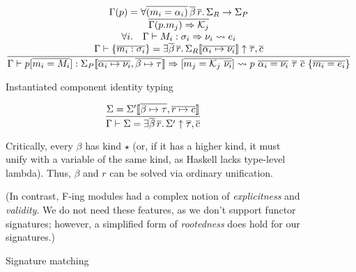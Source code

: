 \documentclass{article}
\begin{document}
\begin{figure}[H]

\[
\frac{
\begin{array}{c}
\Gamma(p) = \forall \overline{(m_i = \alpha_i)}\, \overline{\beta}\, \overline{r}.\, \Sigma_R \rightarrow \Sigma_P \\
\overline{\Gamma(p.m_j) \Rightarrow \mathcal{K}_j} \\
\forall i.\quad \Gamma \vdash M_i : \sigma_i \Rightarrow \nu_i \leadsto{} e_i \\
\Gamma \vdash \{ \overline{m_i : \sigma_i} \} = \exists \overline{\beta}\, \overline{r}.\, \Sigma_R\llbracket\overline{\alpha_i \mapsto \nu_i}\rrbracket \uparrow \overline{\tau}, \overline{c} \\
\end{array}
}{
\Gamma \vdash p[\overline{m_i = M_i}] : \Sigma_P\llbracket\overline{\alpha_i \mapsto \nu_i}, \overline{\beta \mapsto \tau}\rrbracket \Rightarrow [\overline{m_j = \mathcal{K}_j~\overline{\nu_i}}] \leadsto{}  p~\overline{\alpha_i = \nu_i}~\overline{\tau}~\overline{c}~\{\overline{m_i = e_i} \} 
}
\]

\caption{Instantiated component identity typing}
\end{figure}

\begin{figure}[H]

\[
\frac{
\Sigma = \Sigma'\llbracket\overline{\beta \mapsto \tau}, \overline{r \mapsto c}\rrbracket
}{
\Gamma \vdash \Sigma = \exists \overline{\beta}\, \overline{r}.\, \Sigma' \uparrow \overline{\tau}, \overline{c}
}
\]

Critically, every $\beta$ has kind $\star$ (or, if it has
a higher kind, it must unify with a variable of the same kind,
as Haskell lacks type-level lambda).  Thus, $\beta$ and $r$ can
be solved via ordinary unification.

(In contrast, F-ing modules had a complex notion of \emph{explicitness}
and \emph{validity}. We do not need these features, as we don't
support functor signatures; however, a simplified form of \emph{rootedness}
does hold for our signatures.)

\caption{Signature matching}
\end{figure}
\end{document}
